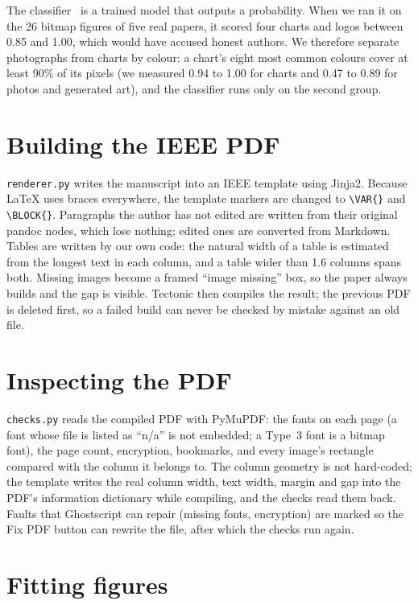 \documentclass[11pt,a4paper,oneside,openany]{book}
\newcommand{\code}[1]{\texttt{#1}}
\begin{document}
The classifier~\cite{aiclassifier} is a trained model that outputs a probability. When we ran it on the 26
bitmap figures of five real papers, it scored four charts and logos between 0.85 and 1.00, which would have
accused honest authors. We therefore separate photographs from charts by colour: a chart's eight most common
colours cover at least 90\% of its pixels (we measured 0.94 to 1.00 for charts and 0.47 to 0.89 for photos
and generated art), and the classifier runs only on the second group.

\section{Building the IEEE PDF}
\code{renderer.py} writes the manuscript into an IEEE template using Jinja2. Because \LaTeX{} uses braces
everywhere, the template markers are changed to \code{\textbackslash VAR\{\}} and \code{\textbackslash BLOCK\{\}}.
Paragraphs the author has not edited are written from their original pandoc nodes, which lose nothing;
edited ones are converted from Markdown. Tables are written by our own code: the natural width of a table
is estimated from the longest text in each column, and a table wider than 1.6 columns spans both. Missing
images become a framed ``image missing'' box, so the paper always builds and the gap is visible. Tectonic
then compiles the result; the previous PDF is deleted first, so a failed build can never be checked by
mistake against an old file.

\section{Inspecting the PDF}
\code{checks.py} reads the compiled PDF with PyMuPDF: the fonts on each page (a font whose file is listed as
``n/a'' is not embedded; a Type~3 font is a bitmap font), the page count, encryption, bookmarks, and every
image's rectangle compared with the column it belongs to. The column geometry is not hard-coded; the
template writes the real column width, text width, margin and gap into the PDF's information dictionary
while compiling, and the checks read them back. Faults that Ghostscript can repair (missing fonts,
encryption) are marked so the Fix PDF button can rewrite the file, after which the checks run again.

\section{Fitting figures}
\end{document}
